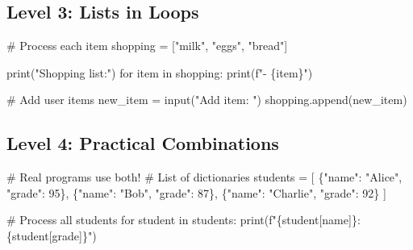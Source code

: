 \documentclass[
  letterpaper,
  DIV=11,
  numbers=noendperiod,
  oneside]{scrreprt}
\newenvironment{Shaded}{}{}
\newcommand{\BuiltInTok}[1]{\textcolor[rgb]{0.84,0.23,0.29}{#1}}
\newcommand{\CommentTok}[1]{\textcolor[rgb]{0.42,0.45,0.49}{#1}}
\newcommand{\ControlFlowTok}[1]{\textcolor[rgb]{0.84,0.23,0.29}{#1}}
\newcommand{\DecValTok}[1]{\textcolor[rgb]{0.00,0.36,0.77}{#1}}
\newcommand{\KeywordTok}[1]{\textcolor[rgb]{0.84,0.23,0.29}{#1}}
\newcommand{\NormalTok}[1]{\textcolor[rgb]{0.14,0.16,0.18}{#1}}
\newcommand{\OperatorTok}[1]{\textcolor[rgb]{0.14,0.16,0.18}{#1}}
\newcommand{\SpecialCharTok}[1]{\textcolor[rgb]{0.00,0.36,0.77}{#1}}
\newcommand{\SpecialStringTok}[1]{\textcolor[rgb]{0.01,0.18,0.38}{#1}}
\newcommand{\StringTok}[1]{\textcolor[rgb]{0.01,0.18,0.38}{#1}}
\begin{document}
\subsection{Level 3: Lists in Loops}\label{level-3-lists-in-loops}

\begin{Shaded}
\begin{Highlighting}[]
\CommentTok{\# Process each item}
\NormalTok{shopping }\OperatorTok{=}\NormalTok{ [}\StringTok{"milk"}\NormalTok{, }\StringTok{"eggs"}\NormalTok{, }\StringTok{"bread"}\NormalTok{]}

\BuiltInTok{print}\NormalTok{(}\StringTok{"Shopping list:"}\NormalTok{)}
\ControlFlowTok{for}\NormalTok{ item }\KeywordTok{in}\NormalTok{ shopping:}
    \BuiltInTok{print}\NormalTok{(}\SpecialStringTok{f"{-} }\SpecialCharTok{\{}\NormalTok{item}\SpecialCharTok{\}}\SpecialStringTok{"}\NormalTok{)}

\CommentTok{\# Add user items}
\NormalTok{new\_item }\OperatorTok{=} \BuiltInTok{input}\NormalTok{(}\StringTok{"Add item: "}\NormalTok{)}
\NormalTok{shopping.append(new\_item)}
\end{Highlighting}
\end{Shaded}

\subsection{Level 4: Practical
Combinations}\label{level-4-practical-combinations}

\begin{Shaded}
\begin{Highlighting}[]
\CommentTok{\# Real programs use both!}
\CommentTok{\# List of dictionaries}
\NormalTok{students }\OperatorTok{=}\NormalTok{ [}
\NormalTok{    \{}\StringTok{"name"}\NormalTok{: }\StringTok{"Alice"}\NormalTok{, }\StringTok{"grade"}\NormalTok{: }\DecValTok{95}\NormalTok{\},}
\NormalTok{    \{}\StringTok{"name"}\NormalTok{: }\StringTok{"Bob"}\NormalTok{, }\StringTok{"grade"}\NormalTok{: }\DecValTok{87}\NormalTok{\},}
\NormalTok{    \{}\StringTok{"name"}\NormalTok{: }\StringTok{"Charlie"}\NormalTok{, }\StringTok{"grade"}\NormalTok{: }\DecValTok{92}\NormalTok{\}}
\NormalTok{]}

\CommentTok{\# Process all students}
\ControlFlowTok{for}\NormalTok{ student }\KeywordTok{in}\NormalTok{ students:}
    \BuiltInTok{print}\NormalTok{(}\SpecialStringTok{f"}\SpecialCharTok{\{}\NormalTok{student[}\StringTok{\textquotesingle{}name\textquotesingle{}}\NormalTok{]}\SpecialCharTok{\}}\SpecialStringTok{: }\SpecialCharTok{\{}\NormalTok{student[}\StringTok{\textquotesingle{}grade\textquotesingle{}}\NormalTok{]}\SpecialCharTok{\}}\SpecialStringTok{"}\NormalTok{)}
\end{Highlighting}
\end{Shaded}
\end{document}
